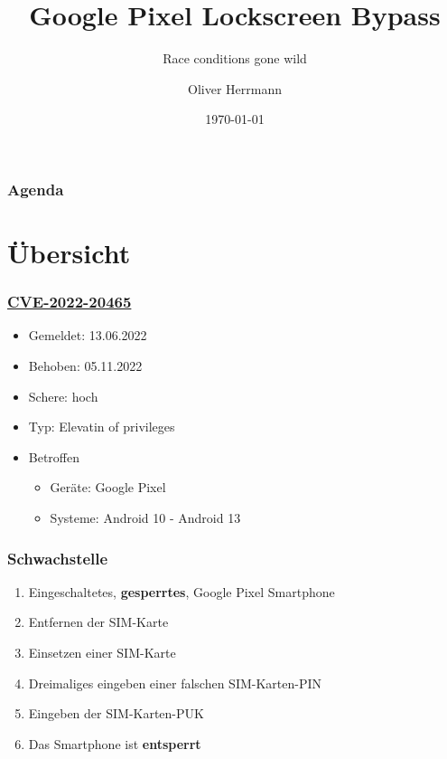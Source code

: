\documentclass{beamer}
\title{Google Pixel Lockscreen Bypass}
\subtitle{Race conditions gone wild}
\author{Oliver Herrmann}
\institute{HTWK Leipzig}
\date{\today}
\begin{document}
\begin{frame}
\titlepage
\end{frame}

\begin{frame}
\frametitle{Agenda}
\tableofcontents
\end{frame}

\section{Übersicht}

\begin{frame}
\frametitle{\href{https://cve.mitre.org/cgi-bin/cvename.cgi?name=CVE-2022-20465}{CVE-2022-20465}}
\begin{itemize}
    \begin{block}{Beschreibung}
        ``Possible lockscreen bypass due to a logic error in the code''
    \end{block}
    \item Gemeldet: 13.06.2022
    \item Behoben: 05.11.2022
    \item Schere: hoch
    \item Typ: Elevatin of privileges
    \item Betroffen
    \begin{itemize}
        \item Geräte: Google Pixel
        \item Systeme: Android 10 - Android 13
    \end{itemize}
\end{itemize}
\end{frame}

\begin{frame}
\frametitle{Schwachstelle}
\begin{enumerate}
    \item Eingeschaltetes, \textbf{gesperrtes}, Google Pixel Smartphone
    \item Entfernen der SIM-Karte
    \item Einsetzen einer SIM-Karte
    \item Dreimaliges eingeben einer falschen SIM-Karten-PIN
    \item Eingeben der SIM-Karten-PUK
    \item Das Smartphone ist \textbf{entsperrt}
\end{enumerate}
\end{frame}
\end{document}
